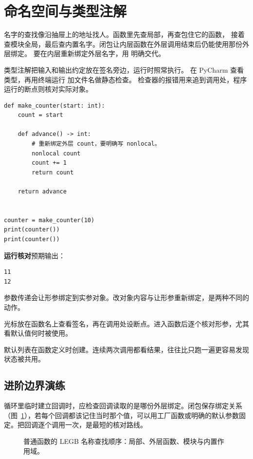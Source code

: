 \par


\section{命名空间与类型注解}

名字的查找像沿抽屉上的地址找人。函数里先查局部，再查包住它的函数，
接着查模块全局，最后查内置名字。闭包让内层函数在外层调用结束后仍能使用那份外层绑定。
要在内层重新绑定外层名字，用  明确交代。

类型注解把输入和输出约定放在签名旁边，运行时照常执行。
在 PyCharm 查看类型，再用终端运行  加文件名做静态检查。
检查器的报错用来追到调用处，程序运行的断点则核对实际对象。


\begin{lstlisting}[title={\code{make_counter.py}}]
def make_counter(start: int):
    count = start

    def advance() -> int:
        # 重新绑定外层 count，要明确写 nonlocal。
        nonlocal count
        count += 1
        return count

    return advance


counter = make_counter(10)
print(counter())
print(counter())
\end{lstlisting}


\textbf{运行核对}\enspace 预期输出：
\begin{lstlisting}[language={},numbers=none]
11
12
\end{lstlisting}

\par

\begin{myunderstanding}
参数传递会让形参绑定到实参对象。改对象内容与让形参重新绑定，是两种不同的动作。
\end{myunderstanding}

\begin{pycharmpractice}
光标放在函数名上查看签名，再在调用处设断点。进入函数后逐个核对形参，尤其看默认值何时被使用。
\end{pycharmpractice}

\begin{pitfall}
默认列表在函数定义时创建。连续两次调用都看结果，往往比只跑一遍更容易发现状态被共用。
\end{pitfall}

\subsection*{进阶边界演练}
循环里临时建立回调时，应检查回调读取的是哪份外层绑定。闭包保存绑定关系（图~\ref{fig:visual-ch4}），若每个回调都该记住当时那个值，可以用工厂函数或明确的默认参数固定。把回调逐个调用一次，是最短的核对路线。

\begin{figure}[htbp]
\centering
{}
\caption{普通函数的 LEGB 名称查找顺序：局部、外层函数、模块与内置作用域。}
\label{fig:visual-ch4}
\end{figure}
